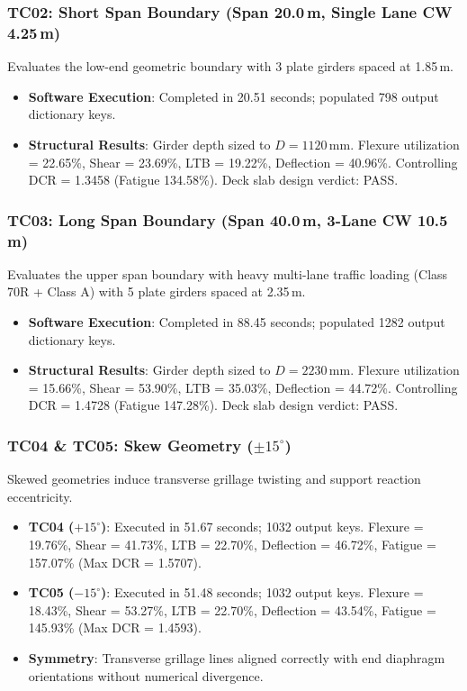 \documentclass[11pt,a4paper]{article}
\begin{document}
\subsubsection{TC02: Short Span Boundary (Span 20.0\,m, Single Lane CW 4.25\,m)}
Evaluates the low-end geometric boundary with 3 plate girders spaced at 1.85\,m.
\begin{itemize}
    \item \textbf{Software Execution}: Completed in 20.51 seconds; populated 798 output dictionary keys.
    \item \textbf{Structural Results}: Girder depth sized to $D = 1120$\,mm. Flexure utilization = 22.65\%, Shear = 23.69\%, LTB = 19.22\%, Deflection = 40.96\%. Controlling DCR = 1.3458 (Fatigue 134.58\%). Deck slab design verdict: PASS.
\end{itemize}

\subsubsection{TC03: Long Span Boundary (Span 40.0\,m, 3-Lane CW 10.5\,m)}
Evaluates the upper span boundary with heavy multi-lane traffic loading (Class 70R + Class A) with 5 plate girders spaced at 2.35\,m.
\begin{itemize}
    \item \textbf{Software Execution}: Completed in 88.45 seconds; populated 1282 output dictionary keys.
    \item \textbf{Structural Results}: Girder depth sized to $D = 2230$\,mm. Flexure utilization = 15.66\%, Shear = 53.90\%, LTB = 35.03\%, Deflection = 44.72\%. Controlling DCR = 1.4728 (Fatigue 147.28\%). Deck slab design verdict: PASS.
\end{itemize}

\subsubsection{TC04 \& TC05: Skew Geometry ($\pm 15^\circ$)}
Skewed geometries induce transverse grillage twisting and support reaction eccentricity.
\begin{itemize}
    \item \textbf{TC04 ($+15^\circ$)}: Executed in 51.67 seconds; 1032 output keys. Flexure = 19.76\%, Shear = 41.73\%, LTB = 22.70\%, Deflection = 46.72\%, Fatigue = 157.07\% (Max DCR = 1.5707).
    \item \textbf{TC05 ($-15^\circ$)}: Executed in 51.48 seconds; 1032 output keys. Flexure = 18.43\%, Shear = 53.27\%, LTB = 22.70\%, Deflection = 43.54\%, Fatigue = 145.93\% (Max DCR = 1.4593).
    \item \textbf{Symmetry}: Transverse grillage lines aligned correctly with end diaphragm orientations without numerical divergence.
\end{itemize}
\end{document}
